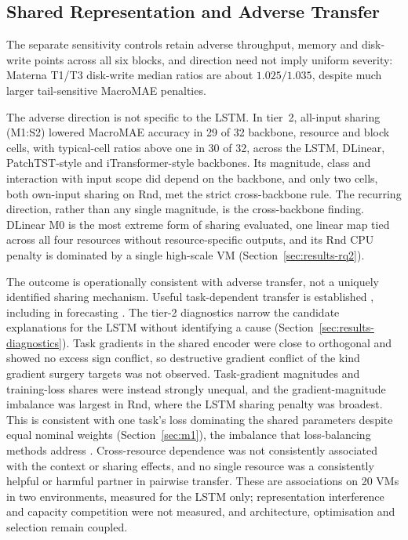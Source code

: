 \documentclass[5p,twocolumn]{elsarticle}
\begin{document}
\subsection{Shared Representation and Adverse Transfer}
\label{sec:discussion-sharing}

The separate sensitivity controls retain adverse throughput, memory and
disk-write points across all six blocks, and direction need not imply uniform
severity: Materna T1/T3 disk-write median ratios are about $1.025/1.035$,
despite much larger tail-sensitive MacroMAE penalties.

The adverse direction is not specific to the LSTM. In tier~2, all-input
sharing (M1:S2) lowered MacroMAE accuracy in 29 of 32 backbone, resource and
block cells, with typical-cell ratios above one in 30 of 32, across the
LSTM, DLinear, PatchTST-style and iTransformer-style backbones. Its
magnitude, class and interaction with input scope did depend on the
backbone, and only two cells, both own-input sharing on Rnd, met the strict
cross-backbone rule. The recurring direction, rather than any single
magnitude, is the cross-backbone finding. DLinear M0 is the most extreme
form of sharing evaluated, one linear map tied across all four resources
without resource-specific outputs, and its Rnd CPU penalty is dominated by a
single high-scale VM (Section~\ref{sec:results-rq2}).

The outcome is operationally consistent with adverse transfer, not a uniquely
identified sharing mechanism. Useful task-dependent transfer is established
\citep{Caruana1997Multitask,Standley2020TaskGrouping,Fifty2021TaskGroupings},
including in forecasting \citep{Nikentari2022NARMAXLSTM,Nochumsohn2025MTLinear}.
The tier-2 diagnostics narrow the candidate explanations for the LSTM
without identifying a cause (Section~\ref{sec:results-diagnostics}). Task
gradients in the shared encoder were close to orthogonal and showed no
excess sign conflict, so destructive gradient conflict of the kind gradient
surgery targets \citep{Yu2020GradientSurgery} was not observed. Task-gradient
magnitudes and training-loss shares were instead strongly unequal, and the
gradient-magnitude imbalance was largest in Rnd, where the LSTM sharing
penalty was broadest. This is consistent
with one task's loss dominating the shared parameters despite equal nominal
weights (Section~\ref{sec:m1}), the imbalance that loss-balancing methods
address \citep{Chen2018GradNorm}. Cross-resource dependence was not
consistently associated with the context or sharing effects, and no single resource was a consistently
helpful or harmful partner in pairwise transfer. These are associations on
20 VMs in two environments, measured for the LSTM only; representation
interference and capacity competition were not measured, and architecture,
optimisation and selection remain coupled.
\end{document}
